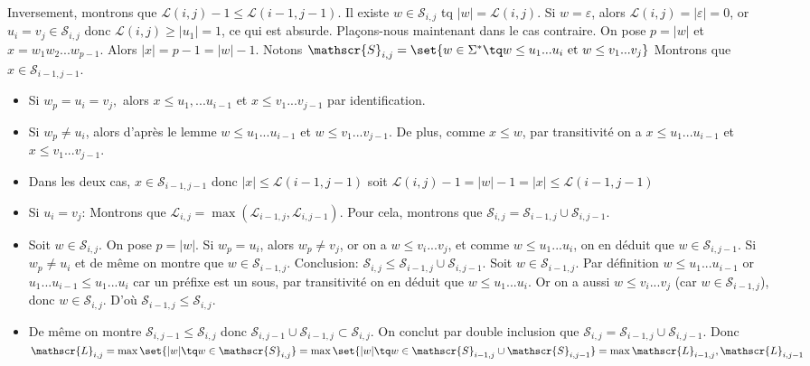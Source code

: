 \documentclass{scrartcl}
\begin{document}
\begin{demo}
				Inversement, montrons que $\mathscr{L}(i,j)-1 \leq \mathscr{L}(i-1,j-1)$.
				Il existe $w \in \mathscr{S}_{i,j}$ tq $|w| = \mathscr{L}(i,j)$. 
				Si $w = \varepsilon$, alors $\mathscr{L}(i,j) = |\varepsilon| = 0$, or $u_i=v_j\in\mathscr{S}_{i,j}$ 
				donc $\mathscr{L}(i,j) \geq |u_1| = 1$, ce qui est absurde. Plaçons-nous maintenant dans le cas contraire.
				On pose $p=|w|$ et $x = w_1w_2...w_{p-1}$. Alors $|x| = p-1 = |w| - 1$.
				Notons $\mathscr{S}_{i,j}=\set{w \in \Sigma^* \tq w \leq u_1...u_i\text{ et }w \leq v_1...v_j}$
				Montrons que $x \in \mathscr{S}_{i-1,j-1}$. 
				\begin{itemize}
					\item Si $w_p = u_i = v_j,$ alors $x \leq u_1,...u_{i-1}$ et $x \leq v_1...v_{j-1}$ par identification.
					\item Si $w_p \neq u_i$, alors d'après le lemme $w \leq u_1...u_{i-1}$ et $w \leq v_1...v_{j-1}$.
					De plus, comme $x \leq w$, par transitivité on a $x \leq u_1...u_{i-1}$ et $x \leq v_1...v_{j-1}$.
					\item Dans les deux cas, $x \in \mathscr{S}_{i-1,j-1}$ donc $|x| \leq \mathscr{L}(i-1,j-1)$ 
					soit $\mathscr{L}(i,j)-1 = |w| - 1 = |x| \leq \mathscr{L}(i-1,j-1)$
					\item Si $u_i = v_j$: Montrons que $\mathscr{L}_{i,j} = \max (\mathscr{L}_{i-1,j},\mathscr{L}_{i,j-1})$.
					Pour cela, montrons que $\mathscr{S}_{i,j} = \mathscr{S}_{i-1,j} \cup \mathscr{S}_{i,j-1}$.
					\item Soit $w \in \mathscr{S}_{i,j}$. On pose $p = |w|$.
					Si $w_p = u_i$, alors $w_p \neq v_j$, or on a $w \leq v_i...v_j$,
					et comme $w \leq u_1...u_i$, on en déduit que $w \in \mathscr{S}_{i,j-1}$.
					Si $w_p \neq u_i$ et de même on montre que $w \in \mathscr{S}_{i-1,j}$.
					Conclusion: $\mathscr{S}_{i,j} \leq \mathscr{S}_{i-1,j} \cup \mathscr{S}_{i,j-1}$.
					Soit $w \in \mathscr{S}_{i-1,j}$. Par définition $w \leq u_1...u_{i-1}$ or
					$u_1...u_{i-1} \leq u_1...u_i$ car un préfixe est un sous, par transitivité on en déduit que
					$w \leq u_1...u_i$. Or on a aussi $w \leq v_i...v_j$ (car $w \in \mathscr{S}_{i-1,j}$),
					donc $w \in \mathscr{S}_{i,j}$. D'où $\mathscr{S}_{i-1,j} \leq \mathscr{S}_{i,j}$.
					\item De même on montre $\mathscr{S}_{i,j-1} \leq \mathscr{S}_{i,j}$ 
					donc $\mathscr{S}_{i,j-1} \cup \mathscr{S}_{i-1,j} \subset \mathscr{S}_{i,j}$.
					On conclut par double inclusion que $\mathscr{S}_{i,j} = \mathscr{S}_{i-1,j} \cup \mathscr{S}_{i,j-1}$.
					Donc $\mathscr{L}_{i,j} = \max\set{|w| \tq w \in \mathscr{S}_{i,j}} =
						 \max\set{|w| \tq w \in \mathscr{S}_{i-1,j} \cup \mathscr{S}_{i,j-1}} = \max{\mathscr{L}_{i-1,j},\mathscr{L}_{i,j-1}} $
				\end{itemize}
			\end{demo}
\end{document}
